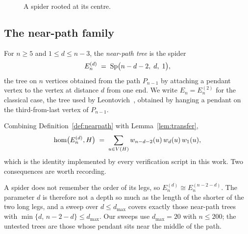\begin{figure}[H]
  \centering
  \caption{A spider rooted at its centre.}
  \label{fig:spider-lemma}
\end{figure}

\subsection{The near-path family}

\begin{definition}
  \label{def:nearpath}
  For $n \ge 5$ and $1 \le d \le n-3$, the \emph{near-path tree} is the
  spider
  \[
    E_n^{(d)} \;=\; \operatorname{Sp}\bigl(n-d-2,\; d,\; 1\bigr),
  \]
  the tree on $n$ vertices obtained from the path $P_{n-1}$ by attaching
  a pendant vertex to the vertex at distance $d$ from one end. We write
  $E_n = E_n^{(2)}$ for the classical case, the tree used by
  Leontovich~\cite{leontovich1989}, obtained by hanging a pendant on the
  third-from-last vertex of $P_{n-1}$.
\end{definition}

Combining Definition~\ref{def:nearpath} with Lemma~\ref{lem:transfer},
\begin{equation}
  \label{eq:nearpath-count}
  \mathrm{hom}\bigl(E_n^{(d)}, H\bigr)
    \;=\; \sum_{u \in V(H)} w_{n-d-2}(u)\, w_{d}(u)\, w_{1}(u),
\end{equation}
which is the identity implemented by every verification script in this
work. Two consequences are worth recording.

\begin{remark}
  \label{rem:d-symmetry}
  A spider does not remember the order of its legs, so
  $E_n^{(d)} \cong E_n^{(n-2-d)}$. The parameter $d$ is therefore not a
  depth so much as the length of the shorter of the two long legs, and a
  sweep over $d \le d_{\max}$ covers exactly those near-path trees with
  $\min\{d,\, n-2-d\} \le d_{\max}$. Our sweeps use
  $d_{\max} = 20$ with $n \le 200$; the untested trees are those whose
  pendant sits near the middle of the path.
\end{remark}

